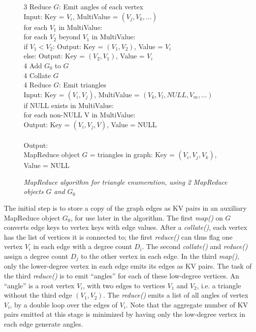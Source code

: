\begin{figure}[htb]
\begin{center}
{\begin{minipage}{\textwidth}
\begin{tabbing}
3 Reduce $G$: \> \> Emit angles of each vertex \\
              \> \> \> Input: Key = $V_i$, MultiValue = $(V_j, V_k, ...)$ \\
	      \> \> \> for each $V_1$ in MultiValue: \\
	      \> \> \> \> for each $V_2$ beyond $V_1$ in MultiValue: \\
	      \> \> \> \> \> if $V_1 < V_2$: Output: Key = $(V_1,V_2)$, Value = $V_i$ \\
	      \> \> \> \> \> else: Output: Key = $(V_2,V_1)$, Value = $V_i$ \\
4 Add $G_0$ to $G$ \\
4 Collate $G$ \\
4 Reduce $G$: \> \> Emit triangles \\
              \> \> \> Input: Key = $(V_i,V_j)$, MultiValue = $(V_k,V_l,NULL,V_m,...)$ \\
              \> \> \> if NULL exists in MultiValue: \\
	      \> \> \> \> for each non-NULL V in MultiValue: \\
	      \> \> \> \> \> Output: Key = $(V_i,V_j,V)$, Value = NULL \\
\\
Output: \\
\> MapReduce object $G$ = triangles in graph: Key = $(V_i,V_j,V_k)$, Value = NULL \\

  \end{tabbing}
 \end{minipage}}\end{center}

 \caption{\it MapReduce algorithm for triangle enumeration, using 2 MapReduce objects $G$ and $G_0$}

 \label{fig:tri}
\end{figure}

The initial step is to store a copy of the graph edges as KV pairs in
an auxiliary MapReduce object $G_0$, for use later in the algorithm.
The first {\it map()} on $G$ converts edge keys to vertex keys with
edge values.  After a {\it collate()}, each vertex has the list of
vertices it is connected to; the first {\it reduce()} can thus flag
one vertex $V_i$ in each edge with a degree count $D_i$.  The second
{\it collate()} and {\it reduce()} assign a degree count $D_j$ to the
other vertex in each edge.  In the third {\it map()}, only the
lower-degree vertex in each edge emits its edges as KV pairs.  The
task of the third {\it reduce()} is to emit ``angles'' for each of
these low-degree vertices.  An ``angle'' is a root vertex $V_i$, with
two edges to vertices $V_1$ and $V_2$, i.e. a triangle without the
third edge $(V_1,V_2)$.  The {\it reduce()} emits a list of all angles
of vertex $V_i$, by a double loop over the edges of $V_i$.  Note that
the aggregate number of KV pairs emitted at this stage is minimized by
having only the low-degree vertex in each edge generate angles.


